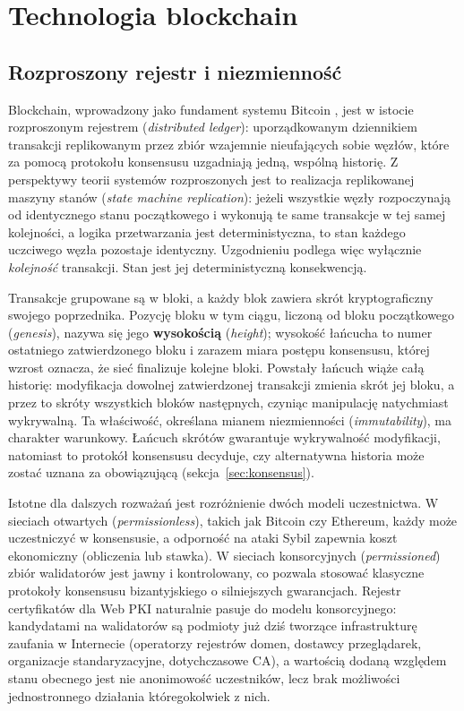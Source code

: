 \chapter{Technologia blockchain}
\label{ch:blockchain}

\section{Rozproszony rejestr i niezmienność}
\label{sec:rozproszony-rejestr}

Blockchain, wprowadzony jako fundament systemu Bitcoin \cite{nakamoto2008bitcoin}, jest w istocie rozproszonym rejestrem (\emph{distributed ledger}): uporządkowanym dziennikiem transakcji replikowanym przez zbiór wzajemnie nieufających sobie węzłów, które za pomocą protokołu konsensusu uzgadniają jedną, wspólną historię. Z perspektywy teorii systemów rozproszonych jest to realizacja replikowanej maszyny stanów (\emph{state machine replication}): jeżeli wszystkie węzły rozpoczynają od identycznego stanu początkowego i wykonują te same transakcje w tej samej kolejności, a logika przetwarzania jest deterministyczna, to stan każdego uczciwego węzła pozostaje identyczny. Uzgodnieniu podlega więc wyłącznie \emph{kolejność} transakcji. Stan jest jej deterministyczną konsekwencją.

Transakcje grupowane są w bloki, a każdy blok zawiera skrót kryptograficzny swojego poprzednika. Pozycję bloku w tym ciągu, liczoną od bloku początkowego (\emph{genesis}), nazywa się jego \textbf{wysokością} (\emph{height}); wysokość łańcucha to numer ostatniego zatwierdzonego bloku i zarazem miara postępu konsensusu, której wzrost oznacza, że sieć finalizuje kolejne bloki. Powstały łańcuch wiąże całą historię: modyfikacja dowolnej zatwierdzonej transakcji zmienia skrót jej bloku, a przez to skróty wszystkich bloków następnych, czyniąc manipulację natychmiast wykrywalną. Ta właściwość, określana mianem niezmienności (\emph{immutability}), ma charakter warunkowy. Łańcuch skrótów gwarantuje wykrywalność modyfikacji, natomiast to protokół konsensusu decyduje, czy alternatywna historia może zostać uznana za obowiązującą (sekcja~\ref{sec:konsensus}).

Istotne dla dalszych rozważań jest rozróżnienie dwóch modeli uczestnictwa. W sieciach otwartych (\emph{permissionless}), takich jak Bitcoin czy Ethereum, każdy może uczestniczyć w konsensusie, a odporność na ataki Sybil zapewnia koszt ekonomiczny (obliczenia lub stawka). W sieciach konsorcyjnych (\emph{permissioned}) zbiór walidatorów jest jawny i kontrolowany, co pozwala stosować klasyczne protokoły konsensusu bizantyjskiego o silniejszych gwarancjach. Rejestr certyfikatów dla Web PKI naturalnie pasuje do modelu konsorcyjnego: kandydatami na walidatorów są podmioty już dziś tworzące infrastrukturę zaufania w Internecie (operatorzy rejestrów domen, dostawcy przeglądarek, organizacje standaryzacyjne, dotychczasowe CA), a wartością dodaną względem stanu obecnego jest nie anonimowość uczestników, lecz brak możliwości jednostronnego działania któregokolwiek z nich.

